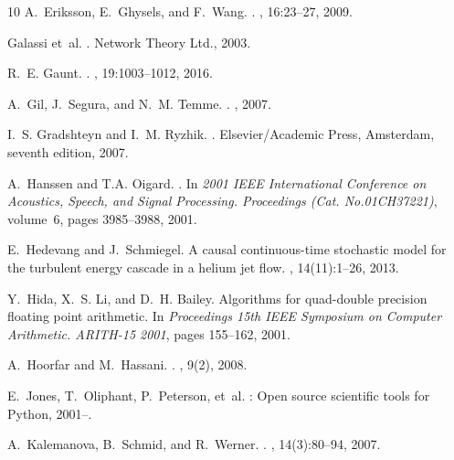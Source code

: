 \documentclass[10pt,a4paper,oneside]{article}
\numberwithin{equation}{section}
\begin{document}
\begin{thebibliography}{10}
A.~Eriksson, E.~Ghysels, and F.~Wang.
.
, 16:23--27, 2009.

Galassi et~al.
.
\newblock Network Theory Ltd., 2003.

R.~E. Gaunt.
.
, 19:1003--1012, 2016.

A.~Gil, J.~Segura, and N.~M. Temme.
.
, 2007.

I.~S. Gradshteyn and I.~M. Ryzhik.
.
\newblock Elsevier/Academic Press, Amsterdam, seventh edition, 2007.

A.~Hanssen and T.A. Oigard.
.
\newblock In {\em 2001 IEEE International Conference on Acoustics, Speech, and
  Signal Processing. Proceedings (Cat. No.01CH37221)}, volume~6, pages
  3985--3988, 2001.

E.~Hedevang and J.~Schmiegel.
\newblock A causal continuous-time stochastic model for the turbulent energy
  cascade in a helium jet flow.
, 14(11):1--26, 2013.

Y.~Hida, X.~S. Li, and D.~H. Bailey.
\newblock Algorithms for quad-double precision floating point arithmetic.
\newblock In {\em Proceedings 15th IEEE Symposium on Computer Arithmetic.
  ARITH-15 2001}, pages 155--162, 2001.

A.~Hoorfar and M.~Hassani.
.
,
  9(2), 2008.

E.~Jones, T.~Oliphant, P.~Peterson, et~al.
: Open source scientific tools for {Python}, 2001--.

A.~Kalemanova, B.~Schmid, and R.~Werner.
.
, 14(3):80--94, 2007.


\end{thebibliography}
\end{document}
